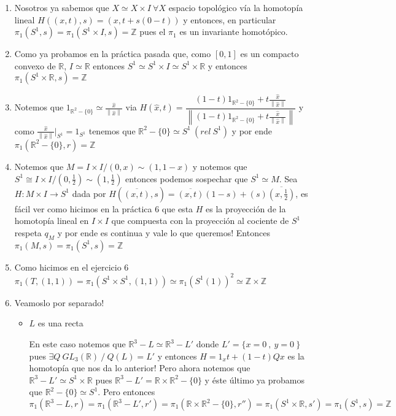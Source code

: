 \documentclass[11pt]{article}
\newcommand{\R}{{\mathbb{R}}}
\newcommand\norm[1]{\left\lVert#1\right\rVert}
\newenvironment{proof}[1][Demostraci\'on]{\begin{trivlist}
\item[\hskip \labelsep {\bfseries #1}]}{\end{trivlist}}
\newcommand{\Z}{\mathbb{Z}}
\begin{document}
\begin{enumerate}
\begin{proof}

\begin{enumerate}

\item Nosotros ya sabemos que $X \simeq X \times I \ \forall X$ espacio topol\'ogico v\'ia la homotop\'ia lineal $H((x,t),s) = (x,t+s(0-t))$ y entonces, en particular $\pi_1(S^1,s) = \pi_1(S^1 \times I,s)=\Z$ pues el $\pi_1$ es un invariante homot\'opico.
\item Como ya probamos en la pr\'actica pasada que, como $[0,1]$ es un compacto convexo de $\R$, $I \simeq \R$ entonces $S^1 \simeq S^1 \times I \simeq S^1 \times \R$ y entonces $\pi_1(S^1 \times \R ,s) = \Z$
\item Notemos que $1_{\R^2 - \{0\}} \simeq \frac{\hat{x}}{\norm{\hat{x}}}$ via $H(\hat{x},t)= \dfrac{(1-t)1_{\R^2 - \{0\}} + t\frac{\hat{x}}{\norm{\hat{x}}}}{\norm{(1-t)1_{\R^2 - \{0\}} + t\frac{\hat{x}}{\norm{\hat{x}}}}}$ y como $\frac{\hat{x}}{\norm{\hat{x}}}|_{S^1} = 1_{S^1}$ tenemos que $\R^2 - \{0\} \simeq S^1 \ (rel \ S^1)$ y por ende $\pi_1(\R^2 - \{0\} , r) = \Z$
\item Notemos que $M = I \times I / \mathord {(0,x) \sim (1,1-x)}$ y notemos que $S^1 \cong I \times I / \mathord {(0,\frac{1}{2}) \sim (1,\frac{1}{2})}$ entonces podemos sospechar que $S^1 \simeq M$. Sea $H: M \times I \rightarrow S^1$ dada por $H(\overline{(x,t)},s)=\overline{(x,t)}(1-s) + (s)\overline{(x,\frac{1}{2})}$, es f\'acil ver como hicimos en la pr\'actica 6 que esta $H$ es la proyecci\'on de la homotop\'ia lineal en $I \times I$ que compuesta con la proyecci\'on al cociente de $S^1$ respeta $q_M$ y por ende es continua y vale lo que queremos! Entonces $\pi_1(M,s) = \pi_1(S^1,s)=\Z$
\item Como hicimos en el ejercicio 6 $\pi_1(T,(1,1)) = \pi_1(S^1 \times S^1 , (1,1)) \simeq \pi_1(S^1(1))^2 \simeq \Z \times \Z$
\item Veamoslo por separado!

\begin{itemize}
\item {$L$ es una recta}

En este caso notemos que $\R^3 - L \simeq \R^3 - L'$ donde $L'= \{ x=0 \ , \ y=0 \ \}$ pues $\exists Q \ GL_3(\R) \ / \ Q(L)=L'$ y entonces $H=1_xt + (1-t)Qx$ es la homotop\'ia que nos da lo anterior! Pero ahora notemos que $\R^3 - L' \simeq S^1 \times \R$ pues $\R^3 - L' = \R \times \R^2 - \{0\}$ y \'este \'ultimo ya probamos que $\R^2 - \{0\} \simeq S^1$. Pero entonces $\pi_1(\R^3 - L,r) = \pi_1(\R^3 - L',r') = \pi_1(\R \times \R^2 - \{0\} ,r'') = \pi_1(S^1 \times \R ,s') = \pi_1(S^1,s)=\Z$


\end{itemize}
\end{enumerate}
\end{proof}
\end{enumerate}
\end{document}
